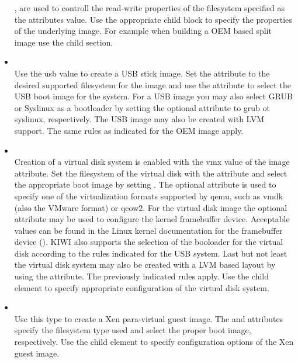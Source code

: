 \begin{itemize}
      ,  are used to controll the
      read-write properties of the filesystem specified as the attributes
      value. Use the appropriate  child block to specify
      the properties of the underlying image. For example when building a 
      OEM based split image use the  child section.
\item {}\\
      Use the usb value to create a USB stick image. Set the
       attribute to the desired supported filesystem for
      the image and use the  attribute to
      select the USB boot image for the system. For a USB image you may
      also select GRUB or Syslinux as a bootloader by setting the
      optional  attribute to grub ot syslinux,
      respectively. The USB image may also be created with LVM support.
      The same rules as indicated for the OEM image apply.
\item {}\\
      Creation of a virtual disk system is enabled with the vmx value of
      the image attribute. Set the filesystem of the virtual disk with
      the  attribute and select the appropriate boot
      image by setting . The optional
       attribute is used to specify one of the virtualization
      formats supported by qemu, such as vmdk (also the VMware format) or
      qcow2. For the virtual disk image the optional  attribute
      may be used to configure the kernel framebuffer device. Acceptable
      values can be found in the Linux kernel documentation for the
      framebuffer device (). KIWI also supports
      the selection of the booloader for the virtual disk according to
      the rules indicated for the USB system. Last but not least
      the virtual disk system may also be created with a LVM based layout by
      using the  attribute. The previously indicated rules apply.
      Use the  child element
      to specify appropriate configuration of the virtual disk system.
\item {}\\
      Use this type to create a Xen para-virtual guest image. The
       and  attributes
      specify the filesystem type used and select the proper boot image,
      respectively. Use the  child element to specify
      configuration options of the Xen guest image.
\end{itemize}

